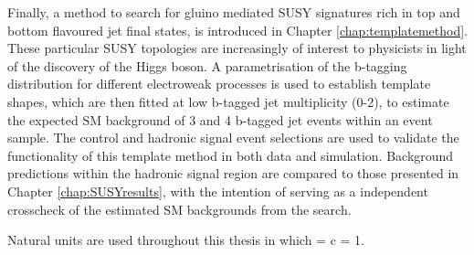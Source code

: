 Finally, a method to search for gluino mediated \ac{SUSY} signatures rich in top and bottom flavoured jet final states, is introduced in Chapter \ref{chap:templatemethod}. These particular \ac{SUSY} topologies are increasingly of interest to physicists in light of the discovery of the Higgs boson. A parametrisation of the b-tagging distribution for different electroweak processes is used to establish template shapes, which are then fitted at low b-tagged jet multiplicity (0-2),  to estimate the expected \ac{SM} background of 3 and 4 b-tagged jet events within an event sample. The \alphat control and hadronic signal event selections are used to validate the functionality of this template method in both data and simulation. Background predictions within the hadronic signal region are compared to those presented in Chapter \ref{chap:SUSYresults}, with the intention of serving as a independent crosscheck of the estimated \ac{SM} backgrounds from the \alphat search. 

Natural units are used throughout this thesis in which \hbarred = c = 1.
